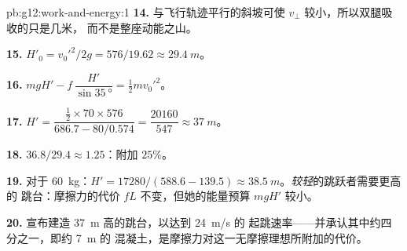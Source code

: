 \begin{solution}{pb:g12:work-and-energy:1}
\textbf{14.} 与飞行轨迹平行的斜坡可使 $v_\perp$
较小，所以双腿吸收的只是几米，
而不是整座动能之山。

\textbf{15.} $H'_0 = v_0'^2/2g = 576/19.62 \approx \qty{29.4}{m}$。

\textbf{16.} $mgH' - f\,\dfrac{H'}{\sin\qty{35}{\degree}} =
\tfrac12 m v_0'^2$。

\textbf{17.} $H' = \dfrac{\tfrac12 \times 70 \times 576}
{686.7 - 80/0.574} = \dfrac{\num{20160}}{547} \approx \qty{37}{m}$。

\textbf{18.} $36.8/29.4 \approx 1.25$：附加 $25\%$。

\textbf{19.} 对于 \qty{60}{kg}：$H' = \num{17280}/(588.6 - 139.5)
\approx \qty{38.5}{m}$。\emph{较轻}的跳跃者需要更高的
跳台：摩擦力的代价 $fL$ 不变，但她的能量预算
$mgH'$ 较小。

\textbf{20.} 宣布建造 \qty{37}{m} 高的跳台，以达到 \qty{24}{m/s} 的
起跳速率——并承认其中约四分之一，即约 \qty{7}{m} 的
混凝土，是摩擦力对这一无摩擦理想所附加的代价。
\end{solution}
